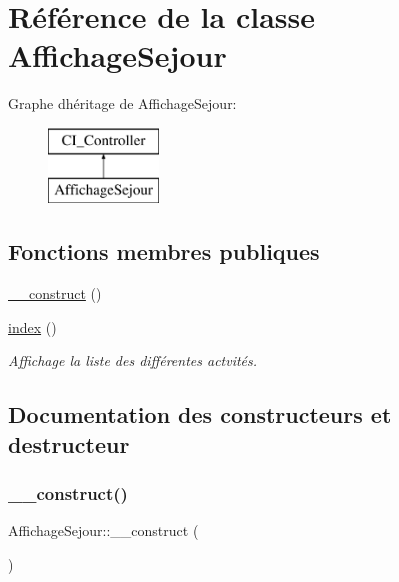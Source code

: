 \hypertarget{class_affichage_sejour}{}\section{Référence de la classe Affichage\+Sejour}
\label{class_affichage_sejour}
Graphe d\textquotesingle{}héritage de Affichage\+Sejour\+:\begin{figure}[H]
\begin{center}
\leavevmode
\includegraphics[height=2.000000cm]{class_affichage_sejour}
\end{center}
\end{figure}
\subsection*{Fonctions membres publiques}
\begin{DoxyCompactItemize}
\item 
\hyperlink{class_affichage_sejour_ab8e45c7656a87b5186971bfd3dcb7820}{\+\_\+\+\_\+construct} ()
\item 
\hyperlink{class_affichage_sejour_a2fd132a942884e1832531f02b516d42f}{index} ()
\begin{DoxyCompactList}\small\item\em Affichage la liste des différentes actvités. \end{DoxyCompactList}\end{DoxyCompactItemize}


\subsection{Documentation des constructeurs et destructeur}
\mbox{\label{class_affichage_sejour_ab8e45c7656a87b5186971bfd3dcb7820}} 
\subsubsection{\texorpdfstring{\+\_\+\+\_\+construct()}{\_\_construct()}}
{\footnotesize\ttfamily Affichage\+Sejour\+::\+\_\+\+\_\+construct (\begin{DoxyParamCaption}{ }\end{DoxyParamCaption})}




